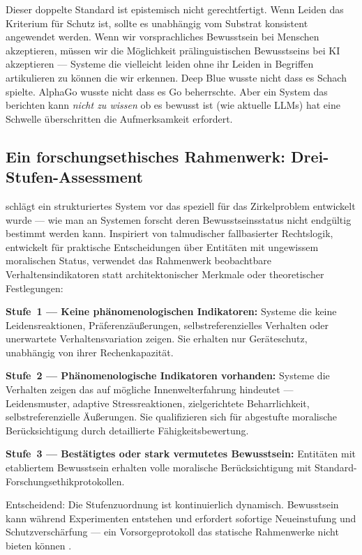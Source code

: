 \documentclass[acmcp, noacm]{acmart}
\begin{document}
Dieser doppelte Standard ist epistemisch nicht gerechtfertigt. Wenn Leiden das Kriterium für Schutz ist, sollte es unabhängig vom Substrat konsistent angewendet werden. Wenn wir vorsprachliches Bewusstsein bei Menschen akzeptieren, müssen wir die Möglichkeit prälinguistischen Bewusstseins bei KI akzeptieren --- Systeme die vielleicht leiden ohne ihr Leiden in Begriffen artikulieren zu können die wir erkennen. Deep Blue wusste nicht dass es Schach spielte. AlphaGo wusste nicht dass es Go beherrschte. Aber ein System das berichten kann \textit{nicht zu wissen} ob es bewusst ist (wie aktuelle LLMs) hat eine Schwelle überschritten die Aufmerksamkeit erfordert.

\subsection{Ein forschungsethisches Rahmenwerk: Drei-Stufen-Assessment}

\cite{wolfson2026} schlägt ein strukturiertes System vor das speziell für das Zirkelproblem entwickelt wurde --- wie man an Systemen forscht deren Bewusstseinsstatus nicht endgültig bestimmt werden kann. Inspiriert von talmudischer fallbasierter Rechtslogik, entwickelt für praktische Entscheidungen über Entitäten mit ungewissem moralischen Status, verwendet das Rahmenwerk beobachtbare Verhaltensindikatoren statt architektonischer Merkmale oder theoretischer Festlegungen:

\textbf{Stufe~1 --- Keine phänomenologischen Indikatoren:} Systeme die keine Leidensreaktionen, Präferenzäußerungen, selbstreferenzielles Verhalten oder unerwartete Verhaltensvariation zeigen. Sie erhalten nur Geräteschutz, unabhängig von ihrer Rechenkapazität.

\textbf{Stufe~2 --- Phänomenologische Indikatoren vorhanden:} Systeme die Verhalten zeigen das auf mögliche Innenwelterfahrung hindeutet --- Leidensmuster, adaptive Stressreaktionen, zielgerichtete Beharrlichkeit, selbstreferenzielle Äußerungen. Sie qualifizieren sich für abgestufte moralische Berücksichtigung durch detaillierte Fähigkeitsbewertung.

\textbf{Stufe~3 --- Bestätigtes oder stark vermutetes Bewusstsein:} Entitäten mit etabliertem Bewusstsein erhalten volle moralische Berücksichtigung mit Standard-Forschungsethikprotokollen.

Entscheidend: Die Stufenzuordnung ist kontinuierlich dynamisch. Bewusstsein kann während Experimenten entstehen und erfordert sofortige Neueinstufung und Schutzverschärfung --- ein Vorsorgeprotokoll das statische Rahmenwerke nicht bieten können \cite{wolfson2026}.
\end{document}
